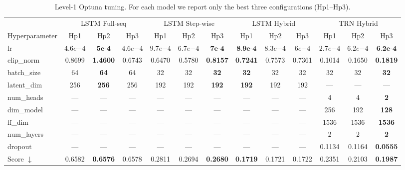 
\begin{table}[H]
\centering
\footnotesize
\setlength{\tabcolsep}{3.0pt}
\renewcommand{\arraystretch}{1.15}
\begin{tabular}{lccc|ccc|ccc|ccc}
\toprule
& \multicolumn{3}{c}{LSTM Full-seq} & \multicolumn{3}{c}{LSTM Step-wise} & \multicolumn{3}{c}{LSTM Hybrid} & \multicolumn{3}{c}{TRN Hybrid} \\
\cmidrule(lr){2-4}\cmidrule(lr){5-7}\cmidrule(lr){8-10}\cmidrule(lr){11-13}
Hyperparameter & Hp1 & Hp2 & Hp3 & Hp1 & Hp2 & Hp3 & Hp1 & Hp2 & Hp3 & Hp1 & Hp2 & Hp3 \\
\midrule
lr              & $4.6e{-4}$ & $\textbf{5e{-4}}$ & $4.6e{-4}$
                & $9.7e{-4}$ & $6.7e{-4}$ & $\textbf{7e{-4}}$
                & $\textbf{8.9e{-4}}$ & $8.3e{-4}$ & $6e{-4}$
                & $2.7e{-4}$ & $6.2e{-4}$ & $\textbf{6.2e{-4}}$ \\

clip\_norm      & 0.8699 & \textbf{1.4600} & 0.6743
                & 0.6470 & 0.5780 & \textbf{0.8157}
                & \textbf{0.7241} & 0.7573 & 0.7361
                & 0.1014 & 0.1650 & \textbf{0.1819} \\

batch\_size     & 64 & \textbf{64} & 64
                & 32 & 32 & \textbf{32}
                & \textbf{32} & 32 & 32
                & 32 & 32 & \textbf{32} \\

latent\_dim     & 256 & \textbf{256} & 256
                & 192 & 192 & \textbf{192}
                & \textbf{192} & 192 & 192
                & --- & --- & --- \\

num\_heads      & --- & --- & ---
                & --- & --- & ---
                & --- & --- & ---
                & 4 & 4 & \textbf{2} \\

dim\_model      & --- & --- & ---
                & --- & --- & ---
                & --- & --- & ---
                & 256 & 192 & \textbf{128} \\

ff\_dim         & --- & --- & ---
                & --- & --- & ---
                & --- & --- & ---
                & 1536 & 1536 & \textbf{1536} \\

num\_layers     & --- & --- & ---
                & --- & --- & ---
                & --- & --- & ---
                & 2 & 2 & \textbf{2} \\

dropout         & --- & --- & ---
                & --- & --- & ---
                & --- & --- & ---
                & 0.1134 & 0.1164 & \textbf{0.0555} \\

\midrule
Score $\downarrow$ &
0.6582 & \textbf{0.6576} & 0.6578 &
0.2811 & 0.2694 & \textbf{0.2680} &
\textbf{0.1719} & 0.1721 & 0.1722 &
0.2351 & 0.2103 & \textbf{0.1987} \\
\bottomrule
\end{tabular}
\caption{Level-1 Optuna tuning. For each model we report only the best three configurations (Hp1--Hp3). }
\label{tab:level1_hp_top3_all}
\end{table}
